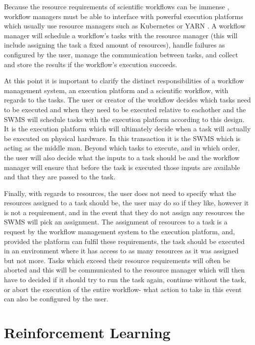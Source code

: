 Because the resource requirements of scientific workflows can be immense \cite{ResourceProvisioning}, workflow managers must be able to interface with powerful execution platforms which usually use resource managers such as Kubernetes \cite{kubernetes} or YARN \cite{yarn}. A workflow manager will schedule a workflow’s tasks with the resource manager (this will include assigning the task a fixed amount of resources), handle failures as configured by the user, manage the communication between tasks, and collect and store the results if the workflow’s execution succeeds.

At this point it is important to clarify the distinct responsibilities of a workflow management system, an execution platform and a scientific workflow, with regards to the tasks. The user or creator of the workflow decides which tasks need to be executed and when they need to be executed relative to eachother and the SWMS will schedule tasks with the execution platform according to this design. It is the execution platform which will ultimately decide when a task will actually be executed on physical hardware. In this transaction it is the SWMS which is acting as the middle man. Beyond which tasks to execute, and in which order, the user will also decide what the inputs to a task should be and the workflow manager will ensure that before the task is executed those inputs are available and that they are passed to the task. 

Finally, with regards to resources, the user does not need to specify what the resources assigned to a task should be, the user may do so if they like, however it is not a requirement, and in the event that they do not assign any resources the SWMS will pick an assignment. The assignment of resources to a task is a request by the workflow management system to the execution platform, and, provided the platform can fulfil these requirements, the task should be executed in an environment where it has access to as many resources as it was assigned but not more. Tasks which exceed their resource requirements will often be aborted and this will be communicated to the resource manager which will then have to decided if it should try to run the task again, continue without the task, or abort the execution of the entire workflow- what action to take in this event can also be configured by the user.

\section{Reinforcement Learning}
\label{sec:rl}

